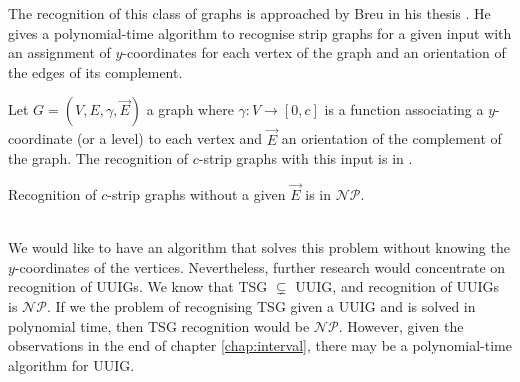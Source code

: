 The recognition of this class of graphs is approached by Breu in his thesis \cite{breuAlgorithmicAspectsConstrained1996}. He gives a polynomial-time algorithm to recognise strip graphs for a given input with an assignment of $y$-coordinates for each vertex of the graph and an orientation of the edges of its complement.

\begin{theorem}
  Let $G = (V,E,\gamma,\overrightarrow{E})$ a graph where $\gamma: V \to [0,c]$ is a function associating a $y$-coordinate (or a level) to each vertex and $\overrightarrow{E}$ an orientation of the complement of the graph. The recognition of $c$-strip graphs with this input is in .
\end{theorem}

\begin{obs}
  Recognition of $c$-strip graphs without a given $\overrightarrow{E}$ is in $\mathcal{NP}$.
\end{obs}

\\

We would like to have an algorithm that solves this problem without knowing the $y$-coordinates of the vertices. Nevertheless, further research would concentrate on recognition of UUIGs. We know that TSG $\subsetneq$ UUIG, and recognition of UUIGs is $\mathcal{NP}$. If we the problem of recognising TSG given a UUIG and is solved in polynomial time, then TSG recognition would be $\mathcal{NP}$. However, given the observations in the end of chapter \ref{chap:interval}, there may be a polynomial-time algorithm for UUIG.
